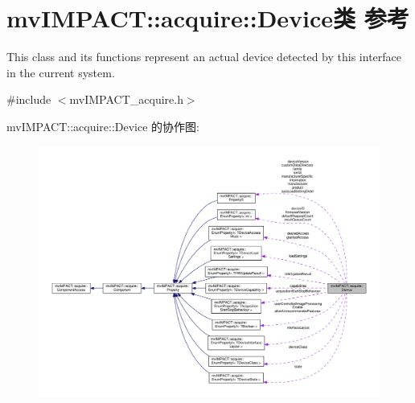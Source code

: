 \hypertarget{classmv_i_m_p_a_c_t_1_1acquire_1_1_device}{\section{mv\+I\+M\+P\+A\+C\+T\+:\+:acquire\+:\+:Device类 参考}
\label{classmv_i_m_p_a_c_t_1_1acquire_1_1_device}
}


This class and its functions represent an actual device detected by this interface in the current system.  




{\ttfamily \#include $<$mv\+I\+M\+P\+A\+C\+T\+\_\+acquire.\+h$>$}



mv\+I\+M\+P\+A\+C\+T\+:\+:acquire\+:\+:Device 的协作图\+:
\nopagebreak
\begin{figure}[H]
\begin{center}
\leavevmode
\includegraphics[width=350pt]{classmv_i_m_p_a_c_t_1_1acquire_1_1_device__coll__graph}
\end{center}
\end{figure}
